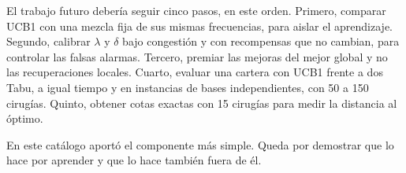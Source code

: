 El trabajo futuro debería seguir cinco pasos, en este orden. Primero, comparar UCB1
con una mezcla fija de sus mismas frecuencias, para aislar el aprendizaje. Segundo,
calibrar $\lambda$ y $\delta$ bajo congestión y con recompensas que no cambian, para
controlar las falsas alarmas. Tercero, premiar las mejoras del mejor global y no las
recuperaciones locales. Cuarto, evaluar una cartera con UCB1 frente a dos Tabu, a igual
tiempo y en instancias de bases independientes, con 50 a 150 cirugías. Quinto, obtener
cotas exactas con 15 cirugías para medir la distancia al óptimo.

En este catálogo aportó el componente más simple. Queda por demostrar que lo hace
por aprender y que lo hace también fuera de él.%
\label{con-fin}
